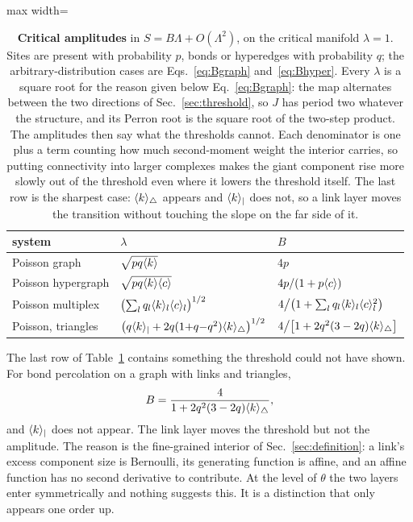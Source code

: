 \begin{table}[t]
\centering\small
\begin{adjustbox}{max width=\linewidth}
\begin{tabular}{lll}
\hline\hline
system & $\lambda$ & $B$\\
\hline
Poisson graph & $\sqrt{pq\langle k \rangle}$ & $4p$\\[2pt]
Poisson hypergraph & $\sqrt{pq\langle k \rangle\langle c \rangle}$ & $4p/(1+p\langle c \rangle)$\\[2pt]
Poisson multiplex & $\bigl(\sum_{l}q_{l}\langle k \rangle_{l}\langle c \rangle_{l}\bigr)^{1/2}$
  & $4\big/\bigl(1+\sum_{l}q_{l}\langle k \rangle_{l}\langle c \rangle_{l}^{2}\bigr)$\\[2pt]
Poisson, triangles & $\bigl(q\langle k \rangle_{|}
  +2q(1{+}q{-}q^{2})\langle k \rangle_{\triangle}\bigr)^{1/2}$
  & $4\big/\bigl[1+2q^{2}(3-2q)\langle k \rangle_{\triangle}\bigr]$\\
\hline\hline
\end{tabular}
\end{adjustbox}
\caption{\textbf{Critical amplitudes} in $S=B\Lambda+O(\Lambda^{2})$, on the
critical manifold $\lambda=1$. Sites are present with probability $p$, bonds or
hyperedges with probability $q$; the arbitrary-distribution cases are
Eqs.~\eqref{eq:Bgraph} and~\eqref{eq:Bhyper}. Every $\lambda$ is a square root
for the reason given below Eq.~\eqref{eq:Bgraph}: the map alternates between the
two directions of Sec.~\ref{sec:threshold}, so $J$ has period two whatever the
structure, and its Perron root is the square root of the two-step product. The
amplitudes then say what the thresholds cannot. Each denominator is one plus a
term counting how much second-moment weight the interior carries, so putting
connectivity into larger complexes makes the giant component rise more slowly
out of the threshold even where it lowers the threshold itself. The last row is
the sharpest case: $\langle k \rangle_{\triangle}$ appears and $\langle k \rangle_{|}$ does not, so a
link layer moves the transition without touching the slope on the far side of
it.}
\label{tab:amplitudes}
\end{table}

The last row of Table~\ref{tab:amplitudes} contains something the threshold
could not have shown. For bond percolation on a graph with links and triangles,
\begin{equation}
  B=\frac{4}{1+2q^{2}(3-2q)\langle k \rangle_{\triangle}},
  \label{eq:Btriangle}
\end{equation}
and $\langle k \rangle_{|}$ does not appear. The link layer moves the threshold but not
the amplitude. The reason is the fine-grained interior of
Sec.~\ref{sec:definition}: a link's excess component size is Bernoulli, its
generating function is affine, and an affine function has no second derivative
to contribute. At the level of $\theta$ the two layers enter symmetrically and
nothing suggests this. It is a distinction that only appears one order up.

